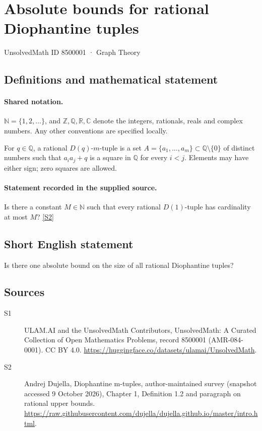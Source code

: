 \documentclass[11pt]{article}
\newcommand{\sref}[2]{\hyperlink{source:#1:#2}{[S#2]}}
\begin{document}
\setcounter{section}{8500000}
\section{Absolute bounds for rational Diophantine tuples}\label{8500001}
{\small\sffamily UnsolvedMath ID 8500001 · Graph Theory}
\subsection{Definitions and mathematical statement}

\paragraph{Shared notation.}$\mathbb N=\{1,2,\ldots\}$, and $\mathbb Z,\mathbb Q,\mathbb R,\mathbb C$ denote the integers, rationals, reals and complex numbers. Any other conventions are specified locally.


For $q\in\mathbb Q$, a rational $D(q)$-$m$-tuple is a set $A=\{a_1,\ldots,a_m\}\subset\mathbb Q\setminus\{0\}$ of distinct numbers such that $a_i a_j+q$ is a square in $\mathbb Q$ for every $i<j$. Elements may have either sign; zero squares are allowed.
\paragraph{Statement recorded in the supplied source.}
Is there a constant $M\in\mathbb N$ such that every rational $D(1)$-tuple has cardinality at most $M$? \sref{8500001}{2}
\subsection{Short English statement}
Is there one absolute bound on the size of all rational Diophantine tuples?
\subsection{Sources}
\begin{description}
\item[\hypertarget{source:8500001:1}{S1}] ULAM.AI and the UnsolvedMath Contributors, UnsolvedMath: A Curated Collection of Open Mathematics Problems, record 8500001 (AMR-084-0001). CC BY 4.0. \url{https://huggingface.co/datasets/ulamai/UnsolvedMath}.
\item[\hypertarget{source:8500001:2}{S2}] Andrej Dujella, Diophantine m-tuples, author-maintained survey (snapshot accessed 9 October 2026), Chapter 1, Definition 1.2 and paragraph on rational upper bounds. \url{https://raw.githubusercontent.com/dujella/dujella.github.io/master/intro.html}.
\end{description}
\label{end:8500001}
\end{document}

